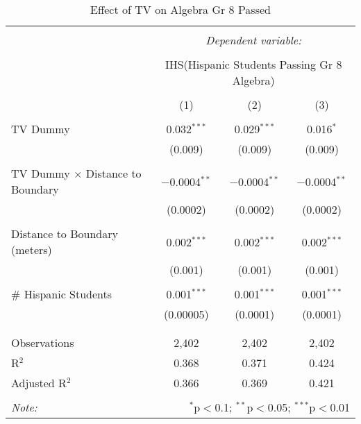 
\begin{table}[!htbp] \centering 
  \caption{Effect of TV on Algebra Gr 8 Passed} 
  \label{} 
\begin{tabular}{@{\extracolsep{-2pt}}lccc} 
\\[-1.8ex]\hline 
\hline \\[-1.8ex] 
 & \multicolumn{3}{c}{\textit{Dependent variable:}} \\ 
\cline{2-4} 
\\[-1.8ex] & \multicolumn{3}{c}{IHS(Hispanic Students Passing Gr 8 Algebra)} \\ 
\\[-1.8ex] & (1) & (2) & (3)\\ 
\hline \\[-1.8ex] 
 TV Dummy & 0.032$^{***}$ & 0.029$^{***}$ & 0.016$^{*}$ \\ 
  & (0.009) & (0.009) & (0.009) \\ 
  & & & \\ 
 TV Dummy $\times$ Distance to Boundary & $-$0.0004$^{**}$ & $-$0.0004$^{**}$ & $-$0.0004$^{**}$ \\ 
  & (0.0002) & (0.0002) & (0.0002) \\ 
  & & & \\ 
 Distance to Boundary (meters) & 0.002$^{***}$ & 0.002$^{***}$ & 0.002$^{***}$ \\ 
  & (0.001) & (0.001) & (0.001) \\ 
  & & & \\ 
 \# Hispanic Students & 0.001$^{***}$ & 0.001$^{***}$ & 0.001$^{***}$ \\ 
  & (0.00005) & (0.0001) & (0.0001) \\ 
  & & & \\ 
\hline \\[-1.8ex] 
Observations & 2,402 & 2,402 & 2,402 \\ 
R$^{2}$ & 0.368 & 0.371 & 0.424 \\ 
Adjusted R$^{2}$ & 0.366 & 0.369 & 0.421 \\ 
\hline 
\hline \\[-1.8ex] 
\textit{Note:}  & \multicolumn{3}{r}{$^{*}$p$<$0.1; $^{**}$p$<$0.05; $^{***}$p$<$0.01} \\ 
\end{tabular} 
\end{table} 
